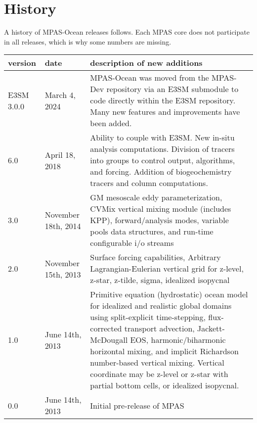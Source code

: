 \chapter*{History}
\label{chap:history}

A history of MPAS-Ocean releases follows.  Each MPAS core does not participate in all releases, which is why some numbers are missing.


\begin{tabular}{ll p{4in}}
\hline\hline version & date & description of new additions  \\
\hline
E3SM 3.0.0 & March 4, 2024 &
MPAS-Ocean was moved from the MPAS-Dev repository via an E3SM submodule to code
directly within the E3SM repository. Many new features and improvements have
been added.
\\
\hline
6.0 & April 18, 2018 &
Ability to couple with E3SM.
New in-situ analysis computations.
Division of tracers into groups to control output, algorithms, and forcing.
Addition of biogeochemistry tracers and column computations.
\\
\hline
3.0 & November 18th, 2014 &
GM mesoscale eddy parameterization, CVMix vertical mixing module (includes KPP), forward/analysis modes, variable pools data structures, and run-time configurable i/o streams \\
\hline
2.0 & November 15th, 2013 &
Surface forcing capabilities, Arbitrary Lagrangian-Eulerian vertical grid for z-level, z-star, z-tilde, sigma, idealized isopycnal \\
\hline
1.0 & June 14th, 2013 & Primitive equation (hydrostatic) ocean model for idealized and realistic global domains using split-explicit time-stepping, flux-corrected transport advection, Jackett-McDougall EOS, harmonic/biharmonic horizontal mixing, and implicit Richardson number-based vertical mixing.  Vertical coordinate may be z-level or z-star with partial bottom cells, or idealized isopycnal. \\
\hline
0.0 & June 14th, 2013 & Initial pre-release of MPAS \\
\hline
\end{tabular}



\newpage

